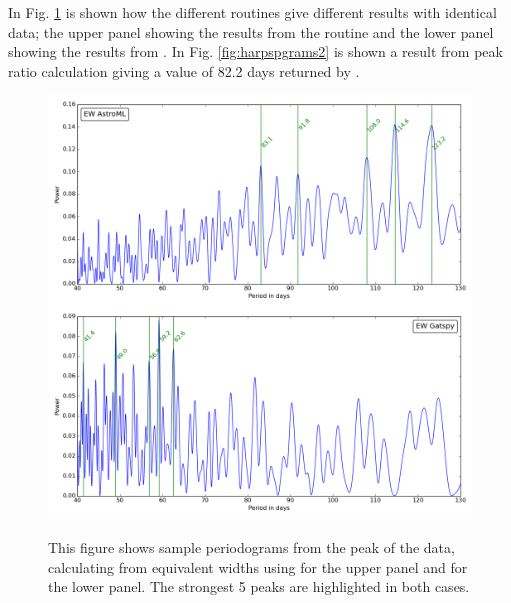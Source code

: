 In Fig. \ref{fig:harpspgrams1} is shown how the different routines give different results with identical data; the upper
panel showing the results from the {\astroml} routine and the lower panel showing the results from {\gatspy}. In
Fig. \ref{fig:harpspgrams2} is shown a result from peak ratio calculation giving a value of 82.2 days returned by
\gatspy.

\begin{figure}[!htbp]
\begin{center}
\includegraphics[scale=0.35]{Figures/summpgrams.png} \\
\end{center}   
\caption{This figure shows sample periodograms from the {\ha} peak of the {\harps} data, calculating from equivalent
  widths using {\astroml} for the upper panel and {\gatspy} for the lower panel. The strongest 5 peaks are highlighted
  in both cases.}
\protect\label{fig:harpspgrams1}
\end{figure}

